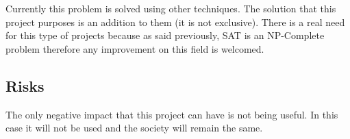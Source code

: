 Currently this problem is solved using other techniques. The solution that this project purposes is an addition to them (it is not exclusive). There is a real need for this type of projects because as said previously, SAT is an NP-Complete problem therefore any improvement on this field is welcomed.

\subsection{Risks}
The only negative impact that this project can have is not being useful. In this case it will not be used and the society will remain the same.
